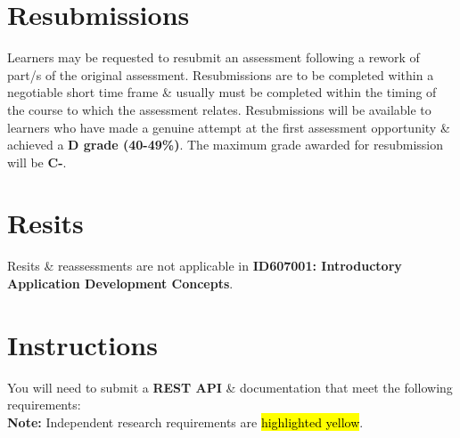 \documentclass{article}
\begin{document}
\section*{Resubmissions}
Learners may be requested to resubmit an assessment following a rework of part/s of the original assessment. Resubmissions are to be completed within a negotiable short time frame \& usually must be completed within the timing of the course to which the assessment relates. Resubmissions will be available to learners who have made a genuine attempt at the first assessment opportunity \& achieved a \textbf{D grade (40-49\%)}. The maximum grade awarded for resubmission will be \textbf{C-}.

\section*{Resits}
Resits \& reassessments are not applicable in \textbf{ID607001: Introductory Application Development Concepts}.

\newpage

\section*{Instructions}
You will need to submit a \textbf{REST API} \& documentation that meet the following requirements: \\

\textbf{Note:} Independent research requirements are \hl{highlighted yellow}.
\end{document}
